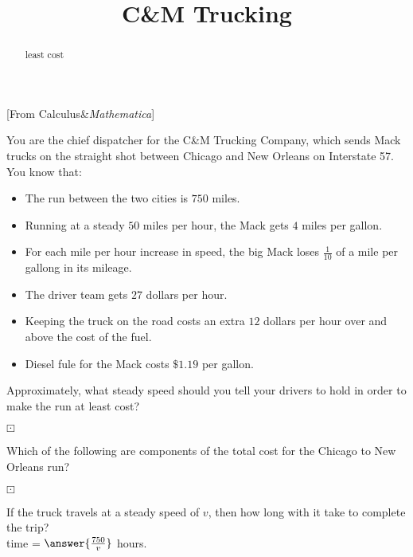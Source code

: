 \documentclass{ximera}
\title{C{\&}M Trucking}
\begin{document}
\begin{abstract}
least cost
\end{abstract}
\maketitle


[From Calculus\&\textit{Mathematica}]




You are the chief dispatcher for the C{\&}M Trucking Company, which sends Mack trucks on the straight shot between Chicago and New Orleans on Interstate 57.  You know that:



\begin{itemize}
\item The run between the two cities is $750$ miles.
\item Running at a steady $50$ miles per hour, the Mack gets $4$ miles per gallon.
\item For each mile per hour increase in speed, the big Mack loses $\frac{1}{10}$ of a mile per gallong in its mileage.
\item The driver team gets $27$ dollars per hour.
\item Keeping the truck on the road costs an extra $12$ dollars per hour over and above the cost of the fuel.
\item Diesel fule for the Mack costs $\$1.19$ per gallon. 
\end{itemize}

Approximately, what steady speed should you tell your drivers to hold in order to make the run at least cost? \\





\begin{question} $\boxdot$

Which of the following are components of the total cost for the Chicago to New Orleans run?

\begin{selectAll}
\end{selectAll}
\end{question}


\begin{question} $\boxdot$

If the truck travels at a steady speed of $v$, then how long with it take to complete the trip? \\

time = $\answer{\frac{750}{v}}$ hours.
\end{question}
\end{document}
